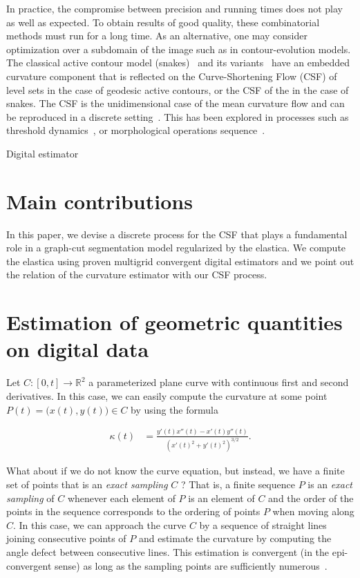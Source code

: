 \documentclass[review]{siamart220329}
\begin{document}
In practice, the compromise between precision and running times does
not play as well as expected. To obtain results of good quality, these
combinatorial methods must run for a long time. As an alternative, one
may consider optimization over a subdomain of the image such as in
contour-evolution models. The classical active contour model
(snakes)~\cite{kass1988snakes} and its
variants~\cite{caseles97geodesic,chan01} have an embedded curvature
component that is reflected on the Curve-Shortening Flow (CSF) of
level sets in the case of geodesic active contours, or the CSF of the
 in the case of snakes. The CSF is the
unidimensional case of the mean curvature flow and can be reproduced
in a discrete setting~\cite{merriman1992diffusion}. This has been
explored in processes such as threshold
dynamics~\cite{esedoglu2005threshold,esedoglu2008threshold}, or
morphological operations sequence~\cite{marquezneila14}.

Digital estimator 
%
%
%
%
\section{Main contributions}
In this paper, we devise a discrete process for the CSF that plays a fundamental
role in a graph-cut segmentation model regularized by the elastica. We compute the
elastica using proven multigrid convergent digital estimators and we point out
the relation of the curvature estimator with our CSF process.
%
%
%
%
\section{Estimation of geometric quantities on digital data}

Let $C:[0,t] \rightarrow \mathbb{R}^2$ a parameterized plane curve with continuous first and second derivatives. In this case, we can easily compute the curvature at some point $P(t) = \big( x(t),y(t) \big) \in C$ by using the formula

\begin{align*}
\kappa (t) &= \frac{y'(t)x''(t) -x'(t)y''(t)}{(x'(t)^2 + y'(t)^2)^{3/2}}.
\end{align*}

What about if we do not know the curve equation, but instead, we have a finite set of points that is an \emph{exact sampling} $C$ ? That is, a finite sequence $P$ is an {\em exact sampling} of $C$ whenever each element of $P$ is an element of $C$ and the order of the points in the sequence corresponds to the ordering of points $P$ when moving along $C$. In this case, we can approach the curve $C$ by a sequence of straight lines joining consecutive points of $P$ and estimate the curvature by computing the angle defect between consecutive lines. This estimation is convergent (in the epi-convergent sense) as long as the sampling points are sufficiently numerous~\cite{bruckstein01discrete,bruckstein01convergence}.
\end{document}
